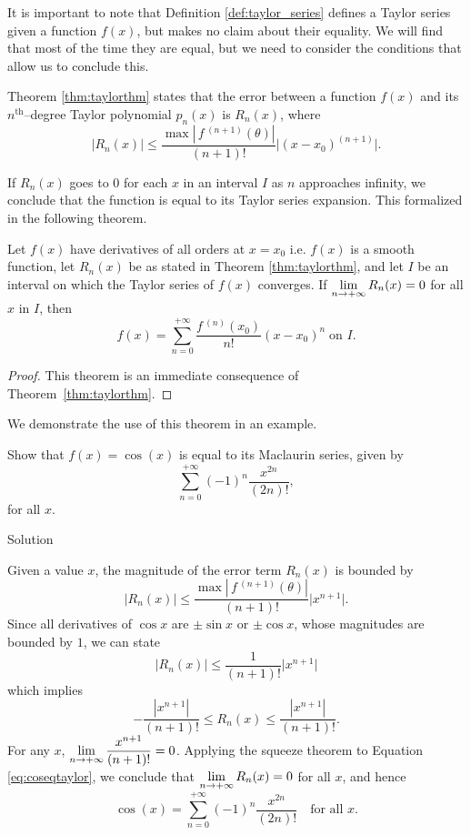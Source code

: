 It is important to note that Definition \ref{def:taylor_series} defines a Taylor series given a function $f(x)$, but makes no claim about their equality.  We will find that most of the time they are equal, but we need to consider the conditions that allow us to conclude this.

Theorem \ref{thm:taylorthm} states that the error between a function $f(x)$ and its $n^\text{th}$--degree Taylor polynomial $p_n(x)$ is $R_n(x)$, where
$$ \big|R_n(x)\big| \leq \frac{\max\left|\,f\,^{(n+1)}(\theta)\right|}{(n+1)!}\big|(x-x_0)^{(n+1)}\big|.$$

If $R_n(x)$ goes to 0 for each $x$ in an interval $I$ as $n$ approaches infinity, we conclude that the function is equal to its Taylor series expansion. This formalized in the following theorem. 

\begin{theorem}\label{thm:function_series_equality}
Let $f(x)$ have derivatives of all orders at $x=x_0$ i.e. $f(x)$ is a smooth function, let $R_n(x)$ be as stated in Theorem \ref{thm:taylorthm}, and let $I$ be an interval on which the Taylor series of $f(x)$ converges. 
If $\displaystyle\lim_{n\to+\infty} R_n(x) = 0$ for all $x$ in $I$, then 
$$f(x) = \sum_{n=0}^{+\infty} \frac{f\,^{(n)}(x_0)}{n!}(x-x_0)^n\;  \text{on $I$}. $$
\end{theorem}

\ifanalysis

\begin{proof}
This theorem is an immediate consequence of Theorem~\ref{thm:taylorthm}. 
\end{proof}
We demonstrate the use of this theorem in an example.\\

\begin{example}\label{ex_ts3}
Show that $f(x) = \cos(x)$ is equal to its Maclaurin series, given by
$$
\sum_{n=0}^{+\infty} (-1)^{n}\frac{x^{2n}}{(2n)!},
$$
for all $x$. 

Solution 

Given a value $x$, the magnitude of the error term $R_n(x)$ is bounded by
$$ \big|R_n(x)\big| \leq \frac{\max\left|\,f\,^{(n+1)}(\theta)\right|}{(n+1)!}\big|x^{n+1}\big|.$$
Since all derivatives of $\cos x$ are $\pm \sin x$ or $\pm\cos x$, whose magnitudes are bounded by $1$, we can state
$$ \big|R_n(x)\big| \leq \frac{1}{(n+1)!}\big|x^{n+1}\big|$$
which implies
\begin{equation}
 -\frac{|x^{n+1}|}{(n+1)!} \leq R_n(x) \leq\frac{|x^{n+1}|}{(n+1)!}.\label{eq:coseqtaylor}
\end{equation}
For any $x$, $\displaystyle\lim_{n\to+\infty} \frac{x^{n+1}}{(n+1)!} = 0$. Applying the squeeze theorem to Equation \eqref{eq:coseqtaylor}, we conclude that $\displaystyle \lim_{n\to+\infty} R_n(x) = 0$ for all $x$, and hence
$$\cos (x) = \sum_{n=0}^{+\infty} (-1)^{n}\frac{x^{2n}}{(2n)!}\quad \text{for all $x$}.$$
\end{example}

